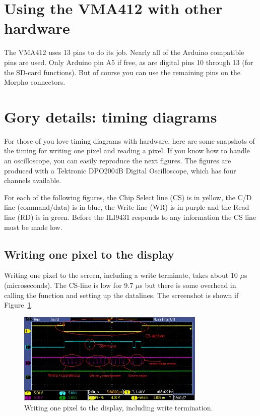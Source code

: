 \documentclass[12pt]{article}
\begin{document}
\section{Using the VMA412 with other hardware}
The VMA412 uses 13 pins to do its job. Nearly all of the Arduino compatible pins are used. Only Arduino pin A5 if free, as are digital pins 10 through 13 (for the SD-card functions). But of course you can use the remaining pins on the Morpho connectors.


\section{Gory details: timing diagrams}
For those of you love timing diagrams with hardware, here are some snapshots of the timing for writing one pixel and reading a pixel. If you know how to handle an oscilloscope, you can easily reproduce the next figures. The figures are produced with a Tektronic DPO2004B Digital Oscilloscope, which has four channels available.

For each of the following figures, the Chip Select line (CS) is in yellow, the C/D line (command/data) is in blue, the Write line (WR) is in purple and the Read line (RD) is in green. Before the ILI9431 responds to any information the CS line must be made low.

\subsection{Writing one pixel to the display}
Writing one pixel to the screen, including a write terminate, takes about 10 $\mu$s (microseconds). The CS-line is low for 9.7 $\mu$s but there is some overhead in calling the function and setting up the datalines. The screenshot is shown if Figure~\ref{fig:10}.

\begin{figure}[!ht]
\centering
\includegraphics[width=0.8\textwidth]{pixel_write}
\caption{Writing one pixel to the display, including write termination.}
\label{fig:10}
\end{figure}
\end{document}
